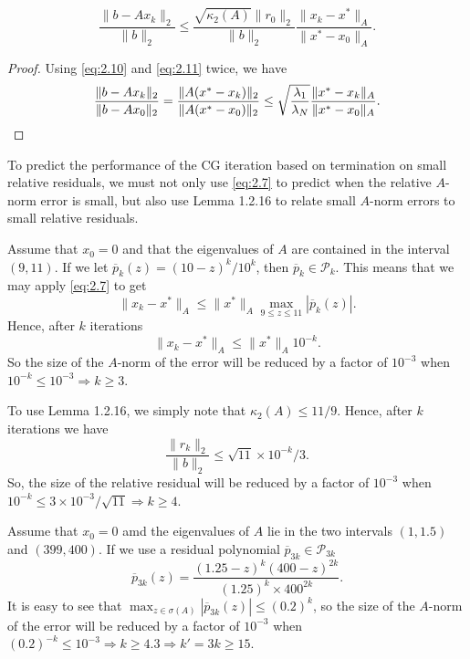 \begin{lemma}
  \begin{equation}
    \label{eq:2.13}
    \frac{\|b-Ax_k\|_2}{\|b\|_2}\leq
    \frac{\sqrt{\kappa_2(A)}\|r_0\|_2}{\|b\|_2}\frac{\|x_k-x^*\|_A}{\|x^*-x_0\|_A}.
  \end{equation}
\end{lemma}

\begin{proof}
  Using  \eqref{eq:2.10} and \eqref{eq:2.11} twice, we have
  \begin{equation*}
    \frac{\|b-Ax_k\|_2}{\|b-Ax_0\|_2}=\frac{\|A(x^*-x_k)\|_2}{\|A(x^*-x_0)\|_2}\leq
  \sqrt{\frac{\lambda_1}{\lambda_N}}\frac{\|x^*-x_k\|_A}{\|x^*-x_0\|_A}.\qedhere
  \end{equation*}
\end{proof}

\begin{rmk}
  To predict the performance of the CG iteration based on termination
  on small relative residuals, we must not only use \eqref{eq:2.7} to
  predict when the relative $A$-norm error is small, but also use
  Lemma 1.2.16 to relate small $A$-norm errors to small relative residuals.
\end{rmk}

\begin{exm}
  Assume that $x_0=0$ and that the eigenvalues of $A$ are contained in
  the interval $(9,11)$. If we let $\overline{p}_k(z)=(10-z)^k/10^k$,
  then $\overline{p}_k\in\mathcal{P}_k.$ This means that we may apply
  \eqref{eq:2.7} to get $$\|x_k-x^*\|_A\leq\|x^*\|_A\max_{9\leq z\leq
    11}|\overline{p}_k(z)|.$$
  Hence, after $k$ iterations
  \begin{equation}
    \label{eq:2.14}
    \|x_k-x^*\|_A\leq \|x^*\|_A10^{-k}.
  \end{equation}
  So the size of the $A$-norm of the error will be reduced by a factor
  of $10^{-3}$ when $10^{-k}\leq 10^{-3} \Rightarrow k\geq 3$.

  To use Lemma 1.2.16, we simply note that $\kappa_2(A)\leq 11/9$. Hence, after $k$
  iterations we have
  $$\frac{\|r_k\|_2}{\|b\|_2}\leq\sqrt{11}\times 10^{-k}/3.$$
  So, the size of the relative residual will be reduced by a factor of
  $10^{-3}$ when $10^{-k}\leq 3\times 10^{-3}/\sqrt{11} \Rightarrow
  k\geq 4.$
\end{exm}

\begin{exm}
  Assume that $x_0=0$ amd the eigenvalues of $A$ lie in the two
  intervals $(1,1.5)$ and $(399,400)$. If we use a residual
  polynomial $\overline{p}_{3k}\in\mathcal{P}_{3k}$
  $$\overline{p}_{3k}(z)=\frac{(1.25-z)^k(400-z)^{2k}}{(1.25)^k\times
    400^{2k}}.$$
  It is easy to see that
  $\max_{z\in\sigma(A)}|\overline{p}_{3k}(z)|\leq(0.2)^k$,
  so the size of the $A$-norm of the error will be reduced by a factor
  of $10^{-3}$ when $(0.2)^{-k}\leq 10^{-3} \Rightarrow k\ge
  4.3\Rightarrow k'=3k\geq 15$. 
\end{exm}

